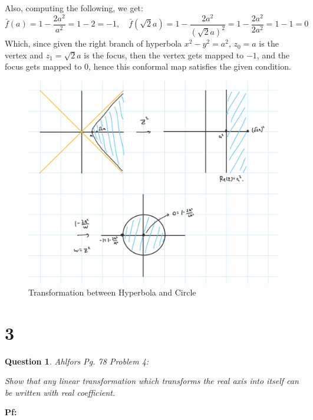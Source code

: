\documentclass{article}
\newtheorem{question}{Question}
\begin{document}
Also, computing the following, we get:
$$\bar{f}(a)=1-\frac{2a^2}{a^2}=1-2=-1,\quad \bar{f}(\sqrt{2}a)=1-\frac{2a^2}{(\sqrt{2}a)^2}=1-\frac{2a^2}{2a^2}=1-1=0$$
Which, since given the right branch of hyperbola $x^2-y^2=a^2$, $z_0=a$ is the vertex and $z_1=\sqrt{2}a$ is the focus,
then the vertex gets mapped to $-1$, and the focus gets mapped to $0$, hence this conformal map satisfies the given condition.

\hfill

\begin{figure}[h!]
    \begin{center}
        \includegraphics*[width=140mm]{hyperbola to circle.jpg}
        \caption{Transformation between Hyperbola and Circle}
    \end{center}
\end{figure}

\break

\section*{3}
\begin{myBox}[]{}
    \begin{question}
        Ahlfors Pg. 78 Problem 4:

        Show that any linear transformation which transforms the real axis
        into itself can be written with real coefficient.
    \end{question}
\end{myBox}

\textbf{Pf:}
\end{document}
